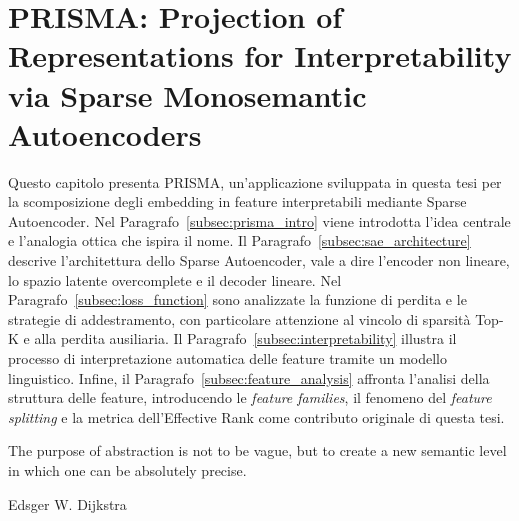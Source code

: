 \section{PRISMA: Projection of Representations for Interpretability via Sparse Monosemantic Autoencoders}
\label{sec:05_prisma}

Questo capitolo presenta PRISMA, un'applicazione sviluppata in questa tesi per la scomposizione degli embedding in feature interpretabili mediante Sparse Autoencoder. Nel Paragrafo~\ref{subsec:prisma_intro} viene introdotta l'idea centrale e l'analogia ottica che ispira il nome. Il Paragrafo~\ref{subsec:sae_architecture} descrive l'architettura dello Sparse Autoencoder, vale a dire l'encoder non lineare, lo spazio latente overcomplete e il decoder lineare. Nel Paragrafo~\ref{subsec:loss_function} sono analizzate la funzione di perdita e le strategie di addestramento, con particolare attenzione al vincolo di sparsità Top-K e alla perdita ausiliaria. Il Paragrafo~\ref{subsec:interpretability} illustra il processo di interpretazione automatica delle feature tramite un modello linguistico. Infine, il Paragrafo~\ref{subsec:feature_analysis} affronta l'analisi della struttura delle feature, introducendo le \textit{feature families}, il fenomeno del \textit{feature splitting} e la metrica dell'Effective Rank come contributo originale di questa tesi.

\epigraph{
    The purpose of abstraction is not to be vague, but to create a new semantic level in which one can be absolutely precise.
}{Edsger W. Dijkstra}

\newpage


